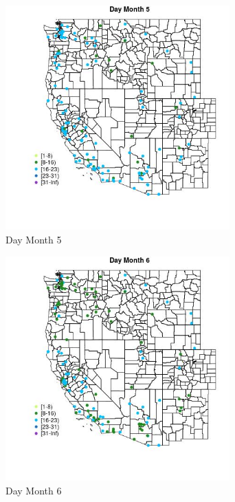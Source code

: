 \begin{figure} 
\centering  
\includegraphics[width=0.77\textwidth]{Code_Outputs/Report_ML_input_PM25_Step4_part_e_de_duplicated_aves_MapObsMo5Day.jpg} 
\caption{\label{fig:Report_ML_input_PM25_Step4_part_e_de_duplicated_avesMapObsMo5Day}Day Month 5} 
\end{figure} 
 

\clearpage 

\begin{figure} 
\centering  
\includegraphics[width=0.77\textwidth]{Code_Outputs/Report_ML_input_PM25_Step4_part_e_de_duplicated_aves_MapObsMo6Day.jpg} 
\caption{\label{fig:Report_ML_input_PM25_Step4_part_e_de_duplicated_avesMapObsMo6Day}Day Month 6} 
\end{figure} 
 

